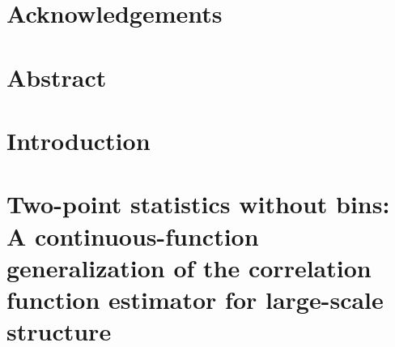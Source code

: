 \documentclass[12pt,oneside,letterpaper]{report}
\begin{document}
\chapter*{Acknowledgements}

% 
\lipsum[1-2]

\newpage


\chapter*{Abstract}



\newpage


\tableofcontents


\cleardoublepage
{}
{}
\listoffigures
\newpage


\cleardoublepage
{}
{}
\listoftables
\newpage





\chapter{Introduction}
\setcounter{section}{-1}
\label{chp-introduction}


\chapter{Two-point statistics without bins: A continuous-function generalization of the correlation function estimator for large-scale structure}
\setcounter{section}{-1}
\label{chp-cfe}
%
\end{document}
